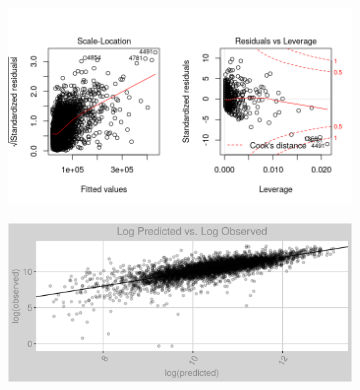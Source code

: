 \begin{figure}[h]
\centering
\begin{subfigure}{1\textwidth}
\centering
\includegraphics[width=.99\textwidth, height=0.425\textheight]{Images/electricity_psf_pls_res_2.png}
\end{subfigure}
\begin{subfigure}{1\textwidth}
\centering
\includegraphics[width=.99\textwidth, height=0.475\textheight]{Images/electricity_psf_pls_pvo.png}
\end{subfigure}
\end{figure}
\FloatBarrier
\newpage
